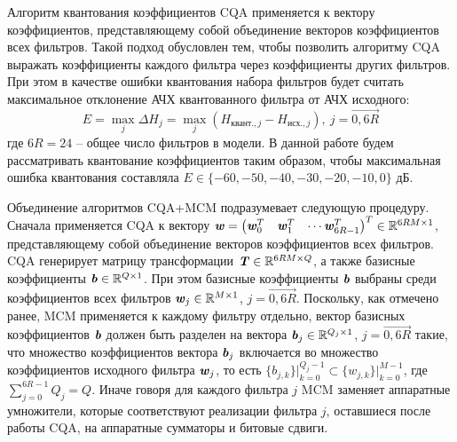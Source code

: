Алгоритм квантования коэффициентов CQA применяется к вектору коэффициентов, представляющему собой объединение векторов коэффициентов всех фильтров. Такой подход обусловлен тем, чтобы позволить алгоритму CQA выражать коэффициенты каждого фильтра через коэффициенты других фильтров. При этом в качестве ошибки квантования набора фильтров будет считать максимальное отклонение АЧХ квантованного фильтра от АЧХ исходного:
\begin{equation}
	E=\max_j\Delta H_j=\max_j(H_{\text{квант.}, j}-H_{\text{исх.}, j}), \ j=\overrightarrow{0, 6R}
	\label{cqa_quant_error}
\end{equation}
где $6R=24$ -- общее число фильтров в модели. В данной работе будем рассматривать квантование коэффициентов таким образом, чтобы максимальная ошибка квантования составляла $E\in\{-60, -50, -40, -30, -20, -10, 0\}$ дБ.

Объединение алгоритмов CQA+MCM подразумевает следующую процедуру. Сначала применяется CQA к вектору $\textbf{\textit{w}}=\begin{pmatrix} \textbf{\textit{w}}_0^T & \textbf{\textit{w}}_1^T & \cdots \textbf{\textit{w}}_{6R-1}^T \end{pmatrix}^T\in\mathbb{R}^{6RM\times1}$, представляющему собой объединение векторов коэффициентов всех фильтров. CQA генерирует матрицу трансформации $\textbf{\textit{T}}\in\mathbb{R}^{6RM\times Q}$, а также базисные коэффициенты $\textbf{\textit{b}}\in\mathbb{R}^{Q\times1}$. При этом базисные коэффициенты $\textbf{\textit{b}}$ выбраны среди коэффициентов всех фильтров $\textbf{\textit{w}}_j\in\mathbb{R}^{M\times1}$, $j=\overrightarrow{0, 6R}$. Поскольку, как отмечено ранее, MCM применяется к каждому фильтру отдельно, вектор базисных коэффициентов $\textbf{\textit{b}}$ должен быть разделен на вектора $\textbf{\textit{b}}_j\in\mathbb{R}^{Q_j\times1}$, $j=\overrightarrow{0, 6R}$ такие, что множество коэффициентов вектора $\textbf{\textit{b}}_j$ включается во множество коэффициентов исходного фильтра $\textbf{\textit{w}}_j$, то есть $\{b_{j, k}\}\big|_{k=0}^{Q_j-1}\subset\{w_{j, k}\}\big|_{k=0}^{M-1}$, где $\sum_{j=0}^{6R-1}Q_j=Q$. Иначе говоря для каждого фильтра $j$ MCM заменяет аппаратные умножители, которые соответствуют реализации фильтра $j$, оставшиеся после работы CQA, на аппаратные сумматоры и битовые сдвиги.


